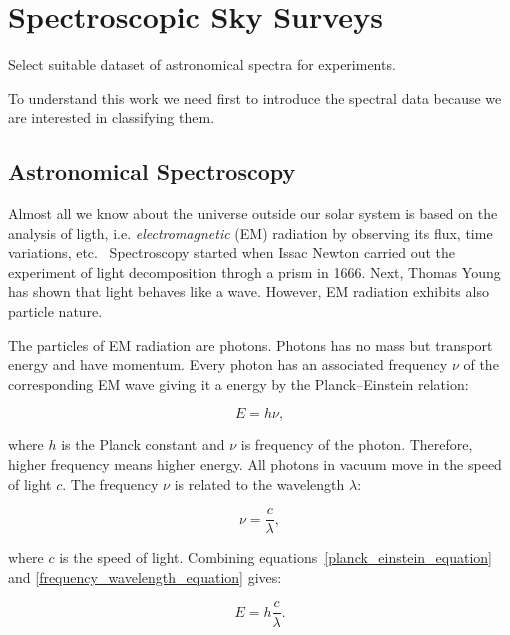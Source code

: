 \chapter{Spectroscopic Sky Surveys}
\label{data_chapter}


Select suitable dataset of astronomical spectra for experiments.

To understand this work we need first to introduce the spectral
data because we are interested in classifying them.

\section{Astronomical Spectroscopy}

Almost all we know about the universe outside our solar system
is based on the analysis of ligth, i.e. \textit{electromagnetic} (EM) radiation
by observing its flux, time variations, etc.~\cite{appenzeller2012}
Spectroscopy started when Issac Newton carried out the experiment of light decomposition throgh a prism in 1666.
Next, Thomas Young has shown that light behaves like a wave.
However, EM radiation exhibits also particle nature.

The particles of EM radiation are photons.
Photons has no mass but transport energy and have momentum.
Every photon has an associated frequency \(\nu\)
of the corresponding EM wave giving it a energy
by the Planck--Einstein relation:

\begin{equation}
	E = h \nu,
	\label{planck_einstein_equation}
\end{equation}

where \(h\) is the Planck constant and \(\nu\) is frequency of the photon.
Therefore, higher frequency means higher energy.
All photons in vacuum move in the speed of light \(c\).
The frequency \(\nu\) is related to the wavelength \(\lambda\):

\begin{equation}
	\nu = \frac{c}{\lambda},
	\label{frequency_wavelength_equation}
\end{equation}

where \(c\) is the speed of light.
Combining equations~\ref{planck_einstein_equation} and \ref{frequency_wavelength_equation} gives:

\begin{equation}
	E = h \frac{c}{\lambda}.
	\label{energy_wavelength}
\end{equation}

